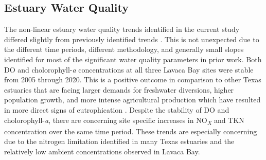 \documentclass[fleqn,10pt,lineno]{wlpeerj} %
\begin{document}
\hypertarget{estuary-water-quality}{%
\subsection*{Estuary Water Quality}\label{estuary-water-quality}}

The non-linear estuary water quality trends identified in the current
study differed slightly from previously identified trends
\autocite{bugica_water_2020}. This is not unexpected due to the
different time periods, different methodology, and generally small
slopes identified for most of the significant water quality parameters
in prior work. Both DO and cholorophyll-\emph{a} concentrations at all
three Lavaca Bay sites were stable from 2005 through 2020. This is a
positive outcome in comparison to other Texas estuaries that are facing
larger demands for freshwater diversions, higher population growth, and
more intense agricultural production which have resulted in more direct
signs of eutrophication
\autocite{wetzWaterQualityDynamics2016,bugica_water_2020}. Despite the
stability of DO and cholorophyll-\emph{a}, there are concerning site
specific increases in NO\textsubscript{\emph{X}} and TKN concentration
over the same time period. These trends are especially concerning due to
the nitrogen limitation identified in many Texas estuaries
\autocite{gardnerNitrogenFixationDissimilatory2006,houTransformationFateNitrate2012,doradoUnderstandingInteractionsFreshwater2015,paudelRelationshipSuspendedSolids2019,wetz_exceptionally_2017}
and the relatively low ambient concentrations observed in Lavaca Bay.
\end{document}
